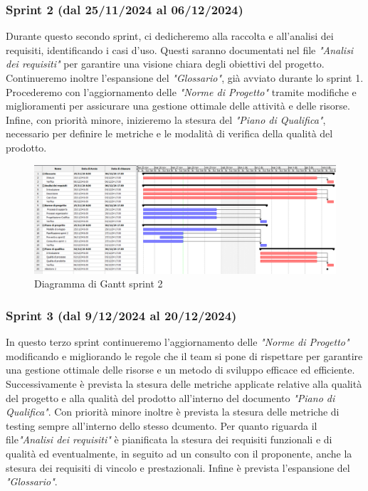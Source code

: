         \subsubsection{Sprint 2 (dal 25/11/2024 al 06/12/2024)}
        Durante questo secondo sprint, ci dedicheremo alla raccolta e all'analisi dei requisiti, identificando i 
        casi d'uso. Questi saranno documentati nel file \textit{"Analisi dei requisiti"} per garantire una visione 
        chiara degli obiettivi del progetto. Continueremo inoltre l'espansione del \textit{"Glossario"}, già 
        avviato durante lo sprint 1.  Procederemo con l'aggiornamento delle \textit{"Norme di Progetto"} tramite modifiche e miglioramenti per assicurare una gestione ottimale delle attività e delle risorse. Infine, con priorità minore, inizieremo la stesura del \textit{"Piano di Qualifica"}, necessario per definire le metriche e le modalità di 
        verifica della qualità del prodotto.

        
        \begin{figure}[h!]
            \centering
            \includegraphics[scale = 0.3]{template/images/gantt2.png}
            \caption{Diagramma di Gantt sprint 2}
            \label{fig:3.2} %
        \end{figure}


        \subsubsection{Sprint 3 (dal 9/12/2024 al 20/12/2024)}
        In questo terzo sprint continueremo l'aggiornamento delle \textit{"Norme di Progetto"} modificando e migliorando le regole che il team si pone di rispettare per garantire
        una gestione ottimale delle risorse e un metodo di sviluppo efficace ed efficiente. Successivamente è prevista la stesura delle metriche applicate relative alla qualità del progetto e alla qualità del prodotto all'interno del documento \textit{"Piano di Qualifica"}.
        Con priorità minore inoltre è prevista la stesura delle metriche di testing sempre all'interno dello stesso dcumento.
        Per quanto riguarda il file\textit{"Analisi dei requisiti"} è pianificata la stesura dei requisiti funzionali e di qualità ed eventualmente, in seguito ad un consulto con il proponente, anche la stesura dei requisiti di vincolo e prestazionali.
        Infine è prevista l'espansione del \textit{"Glossario"}.
 
